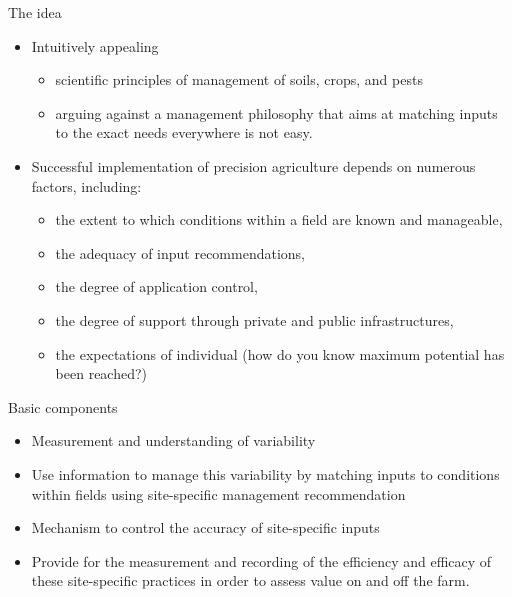 \documentclass[11pt,dvipsnames,ignorenonframetext,aspectratio=169]{beamer}
\providecommand{\tightlist}{%
  \setlength{\itemsep}{0pt}\setlength{\parskip}{0pt}}
\begin{document}
\begin{frame}{The idea}
\protect\hypertarget{the-idea}{}
\begin{itemize}
\tightlist
\item
  Intuitively appealing

  \begin{itemize}
  \tightlist
  \item
    scientific principles of management of soils, crops, and pests
  \item
    arguing against a management philosophy that aims at matching inputs
    to the exact needs everywhere is not easy.
  \end{itemize}
\item
  Successful implementation of precision agriculture depends on numerous
  factors, including:

  \begin{itemize}
  \tightlist
  \item
    the extent to which conditions within a field are known and
    manageable,
  \item
    the adequacy of input recommendations,
  \item
    the degree of application control,
  \item
    the degree of support through private and public infrastructures,
  \item
    the expectations of individual (how do you know maximum potential
    has been reached?)
  \end{itemize}
\end{itemize}
\end{frame}

\begin{frame}{Basic components}
\protect\hypertarget{basic-components}{}
\begin{itemize}
\tightlist
\item
  Measurement and understanding of variability
\item
  Use information to manage this variability by matching inputs to
  conditions within fields using
  \alert{site-specific management recommendation}
\item
  Mechanism to control the accuracy of site-specific inputs
\item
  Provide for the measurement and recording of the efficiency and
  efficacy of these site-specific practices in order to assess value on
  and off the farm.
\end{itemize}
\end{frame}
\end{document}
